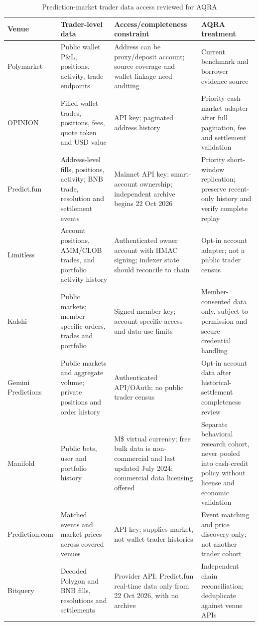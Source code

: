 \documentclass[conference]{IEEEtran}
\begin{document}
\begin{table}[t]
\caption{Prediction-market trader data access reviewed for AQRA}
\label{tab:venues}
\centering
\small
\begin{tabularx}{\textwidth}{lXXX}
\toprule
Venue & Trader-level data & Access/completeness constraint & AQRA treatment\\
\midrule
Polymarket & Public wallet P\&L, positions, activity, trade endpoints & Address can be proxy/deposit account; source coverage and wallet linkage need auditing & Current benchmark and borrower evidence source \cite{polymarket-pnl}\\
OPINION & Filled wallet trades, positions, fees, quote token and USD value & API key; paginated address history & Priority cash-market adapter after full pagination, fee and settlement validation \cite{opinion-trades,opinion-positions}\\
Predict.fun & Address-level fills, positions, activity; BNB trade, resolution and settlement events & Mainnet API key; smart-account ownership; independent archive begins 22 Oct 2026 & Priority short-window replication; preserve recent-only history and verify complete replay \cite{predict-api,predict-activity,predict-matches,bitquery-predict}\\
Limitless & Account positions, AMM/CLOB trades, and portfolio activity history & Authenticated owner account with HMAC signing; indexer state should reconcile to chain & Opt-in account adapter; not a public trader census \cite{limitless-api}\\
Kalshi & Public markets; member-specific orders, trades and portfolio & Signed member key; account-specific access and data-use limits & Member-consented data only, subject to permission and secure credential handling \cite{kalshi-keys,kalshi-developer,kalshi-data}\\
Gemini Predictions & Public markets and aggregate volume; private positions and order history & Authenticated API/OAuth; no public trader census & Opt-in account data after historical-settlement completeness review \cite{gemini-prediction,gemini-position}\\
Manifold & Public bets, user and portfolio history & M\$ virtual currency; free bulk data is non-commercial and last updated July 2024; commercial data licensing offered & Separate behavioral research cohort, never pooled into cash-credit policy without license and economic validation \cite{manifold-api,manifold-data}\\
Prediction.com & Matched events and market prices across covered venues & API key; supplies market, not wallet-trader histories & Event matching and price discovery only; not another trader cohort \cite{prediction-aggregator}\\
Bitquery & Decoded Polygon and BNB fills, resolutions and settlements & Provider API; Predict.fun real-time data only from 22 Oct 2026, with no archive & Independent chain reconciliation; deduplicate against venue APIs \cite{bitquery-pm,bitquery-predict}\\
\bottomrule
\end{tabularx}
\end{table}
\end{document}
